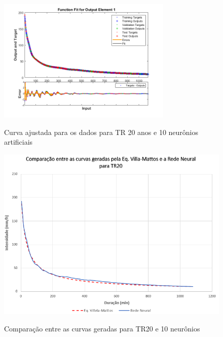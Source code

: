 \begin{figure}[H]
    \caption{Curva ajustada para os dados para TR 20 anos e 10 neurônios artificiais}
    \centering
    \includegraphics[width=0.74\textwidth]{Textuais/Figuras/NN/tr20-10neuronio.png}
    \label{fig:tr20-10n}
\end{figure}

\begin{figure}[H]
    \caption{Comparação entre as curvas geradas para TR20 e 10 neurônios}
    \centering
    \includegraphics[width=\textwidth]{Textuais/Resultados/Comparacao/TR20.png}
    \label{fig:comp-tr20}
\end{figure}